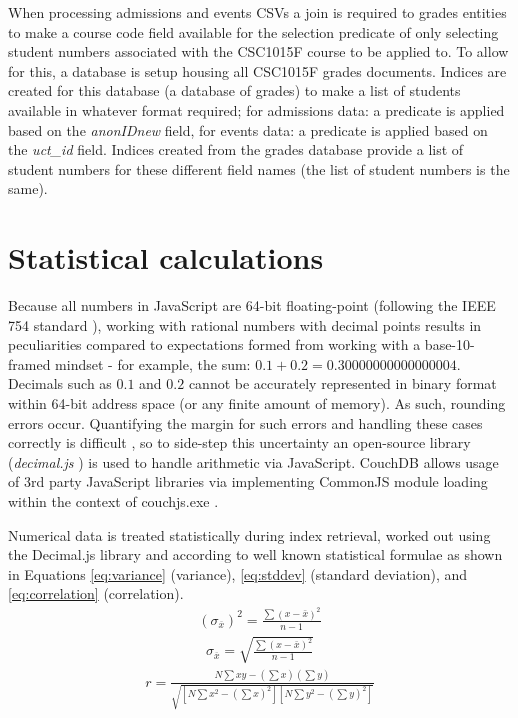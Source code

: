 When processing admissions and events CSVs a join is required to grades entities to make a course code field available for the selection predicate of only selecting student numbers associated with the CSC1015F course to be applied to. To allow for this, a database is setup housing all CSC1015F grades documents. Indices are created for this database (a database of grades) to make a list of students available in whatever format required; for admissions data: a predicate is applied based on the \textit{anonIDnew} field, for events data: a predicate is applied based on the \textit{uct\_id} field. Indices created from the grades database provide a list of student numbers for these different field names (the list of student numbers is the same).



\section{Statistical calculations}
Because all numbers in JavaScript are 64-bit floating-point (following the IEEE 754 standard \cite{floatingPoint}), working with rational numbers with decimal points results in peculiarities compared to expectations formed from working with a base-10-framed mindset - for example, the sum: $0.1 + 0.2 = 0.30000000000000004$. Decimals such as $0.1$ and $0.2$ cannot be accurately represented in binary format within 64-bit address space (or any finite amount of memory). As such, rounding errors occur. Quantifying the margin for such errors and handling these cases correctly is difficult \cite{Goldberg1991}, so to side-step this uncertainty an open-source library (\textit{decimal.js} \cite{decimaljs}) is used to handle arithmetic via JavaScript. CouchDB allows usage of 3rd party JavaScript libraries via implementing CommonJS module loading within the context of couchjs.exe \cite{commonJsMapFn}.

Numerical data is treated statistically during index retrieval, worked out using the Decimal.js library and according to well known statistical formulae as shown in Equations \ref{eq:variance} (variance), \ref{eq:stddev} (standard deviation), and \ref{eq:correlation} (correlation).
\begin{align}
    (\sigma_{\overline{x}})^{2} = \frac{\sum{(x-\bar{x})^2}}{n-1}\label{eq:variance}
\end{align}
\begin{align}
    \sigma_{\overline{x}} = \sqrt{\frac{\sum{(x-\bar{x})^2}}{n-1}}\label{eq:stddev}
\end{align}
\begin{align}
    r = \frac{N\sum{xy} - (\sum{x})(\sum{y})}{\sqrt{[N\sum{x^2} - (\sum{x})^2][N\sum{y^2} - (\sum{y})^2]}} \label{eq:correlation}
\end{align}